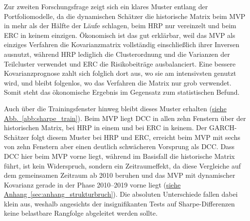 \documentclass[a4paper, 12pt]{article}
\begin{document}
Zur zweiten Forschungsfrage zeigt sich ein klares Muster entlang der Portfoliomodelle, da die dynamischen Schätzer die historische Matrix beim MVP in mehr als der Hälfte der Läufe schlagen, beim HRP nur vereinzelt und beim ERC in keinem einzigen.
Ökonomisch ist das gut erklärbar, weil das MVP als einziges Verfahren die Kovarianzmatrix vollständig einschließlich ihrer Inversen ausnutzt, während HRP lediglich die Clusterordnung und die Varianzen der Teilcluster verwendet und ERC die Risikobeiträge ausbalanciert.
Eine bessere Kovarianzprognose zahlt sich folglich dort aus, wo sie am intensivsten genutzt wird, und bleibt folgenlos, wo das Verfahren die Matrix nur grob verwendet.
Somit steht das ökonomische Ergebnis im Gegensatz zum statistischen Befund.



Auch über die Trainingsfenster hinweg bleibt dieses Muster erhalten (\hyperref[abb:sharpe_train]{siehe Abb.~\ref*{abb:sharpe_train}}).
Beim MVP liegt DCC in allen zehn Fenstern über der historischen Matrix, bei HRP in einem und bei ERC in keinem.
Der GARCH-Schätzer folgt diesem Muster bei HRP und ERC, erreicht beim MVP mit sechs von zehn Fenstern aber einen deutlich schwächeren Vorsprung als DCC.
Dass DCC hier beim MVP vorne liegt, während im Basisfall die historische Matrix führt, ist kein Widerspruch, sondern ein Zeitraumeffekt, da diese Vergleiche auf dem gemeinsamen Zeitraum ab 2010 beruhen und das MVP mit dynamischer Kovarianz gerade in der Phase 2010--2019 vorne liegt (\hyperref[sec:anhang_strukturbruch]{siehe Anhang~\ref*{sec:anhang_strukturbruch}}).
Die absoluten Unterschiede fallen dabei klein aus, weshalb angesichts der insignifikanten Tests auf Sharpe-Differenzen keine belastbare Rangfolge abgeleitet werden sollte.

%


\end{document}
